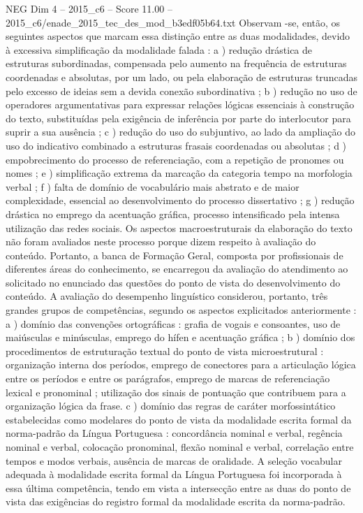 \begin{textsample}{NEG Dim 4 – 2015\_c6 – Score 11.00 – 2015\_c6/enade\_2015\_tec\_des\_mod\_b3edf05b64.txt}
Observam -se, então, os seguintes aspectos que marcam essa distinção entre as duas modalidades, devido à excessiva simplificação da modalidade falada : a ) redução drástica de estruturas subordinadas, compensada pelo aumento na frequência de estruturas coordenadas e absolutas, por um lado, ou pela elaboração de estruturas truncadas pelo excesso de ideias sem a devida conexão subordinativa ; b ) redução no uso de operadores argumentativas para expressar relações lógicas essenciais à construção do texto, substituídas pela exigência de inferência por parte do interlocutor para suprir a sua ausência ; c ) redução do uso do subjuntivo, ao lado da ampliação do uso do indicativo combinado a estruturas frasais coordenadas ou absolutas ; d ) empobrecimento do processo de referenciação, com a repetição de pronomes ou nomes ; e ) simplificação extrema da marcação da categoria tempo na morfologia verbal ; f ) falta de domínio de vocabulário mais abstrato e de maior complexidade, essencial ao desenvolvimento do processo dissertativo ; g ) redução drástica no emprego da acentuação gráfica, processo intensificado pela intensa utilização das redes sociais.
Os aspectos macroestruturais da elaboração do texto não foram avaliados neste processo porque dizem respeito à avaliação do conteúdo.
Portanto, a banca de Formação Geral, composta por profissionais de diferentes áreas do conhecimento, se encarregou da avaliação do atendimento ao solicitado no enunciado das questões do ponto de vista do desenvolvimento do conteúdo.
A avaliação do desempenho linguístico considerou, portanto, três grandes grupos de competências, segundo os aspectos explicitados anteriormente : a ) domínio das convenções ortográficas : grafia de vogais e consoantes, uso de maiúsculas e minúsculas, emprego do hífen e acentuação gráfica ; b ) domínio dos procedimentos de estruturação textual do ponto de vista microestrutural : organização interna dos períodos, emprego de conectores para a articulação lógica entre os períodos e entre os parágrafos, emprego de marcas de referenciação lexical e pronominal ; utilização dos sinais de pontuação que contribuem para a organização lógica da frase. c ) domínio das regras de caráter morfossintático estabelecidas como modelares do ponto de vista da modalidade escrita formal da norma-padrão da Língua Portuguesa : concordância nominal e verbal, regência nominal e verbal, colocação pronominal, flexão nominal e verbal, correlação entre tempos e modos verbais, ausência de marcas de oralidade.
A seleção vocabular adequada à modalidade escrita formal da Língua Portuguesa foi incorporada à essa última competência, tendo em vista a intersecção entre as duas do ponto de vista das exigências do registro formal da modalidade escrita da norma-padrão.

\end{textsample}
